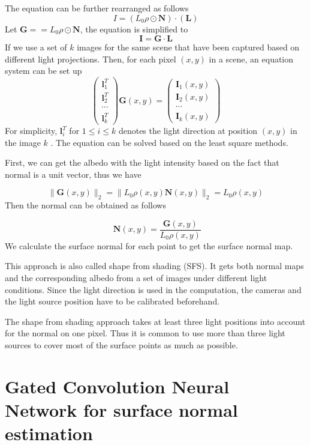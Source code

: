 The equation can be further rearranged as follows
\[ I =(L_0\rho \odot \textbf{N}) \cdot  ( \textbf{L}) \]
Let $ \textbf{G} = =L_0\rho \odot \textbf{N} $, the equation is simplified to 
\[\textbf{I} = \textbf{G} \cdot \textbf{L}\]
If we use a set of $ k $ images for the same scene that have been captured based on different light projections. Then, for each pixel $ (x,y) $ in a scene, an equation system can be set up 
\[ 
\begin{pmatrix}
	\textbf{l}_1^T \\
	\textbf{l}_2^T \\
	\cdots \\
	\textbf{l}_k^T
\end{pmatrix} \textbf{G}(x,y) = 
\begin{pmatrix}
	\textbf{I}_1(x,y) \\
	\textbf{I}_2(x,y) \\
	\cdots \\
	\textbf{I}_k(x,y)
\end{pmatrix}
\]
For simplicity, $ \textbf{l}_i^T $ for $ 1\le i \le k $ denotes the light direction at position $ (x,y) $ in the image $ k $ . The equation can be solved based on the least square methods. 

First, we can get the albedo with the light intensity based on the fact that normal is a unit vector, thus we have 

\[ \|\textbf{G}(x,y)\|_2 = \|L_0\rho(x,y)\textbf{N}(x,y)\|_2 = L_0\rho(x,y) \]
Then the normal can be obtained as follows

\[ \textbf{ N}(x,y) = \frac{\textbf{G}(x,y)}{L_0\rho(x,y)}\]
We calculate the surface normal for each point to get the surface normal map. 

This approach is also called shape from shading (SFS)\cite{SFS}. It gets both normal maps and the corresponding albedo from a set of images under different light conditions. Since the light direction is used in the computation, the cameras and the light source position have to be calibrated beforehand. 

The shape from shading approach takes at least three light positions into account for the normal on one pixel. Thus it is common to use more than three light sources to cover most of the surface points as much as possible. 

\newpage 
\section{Gated Convolution Neural Network for surface normal estimation}
\label{sec:gcnn}

